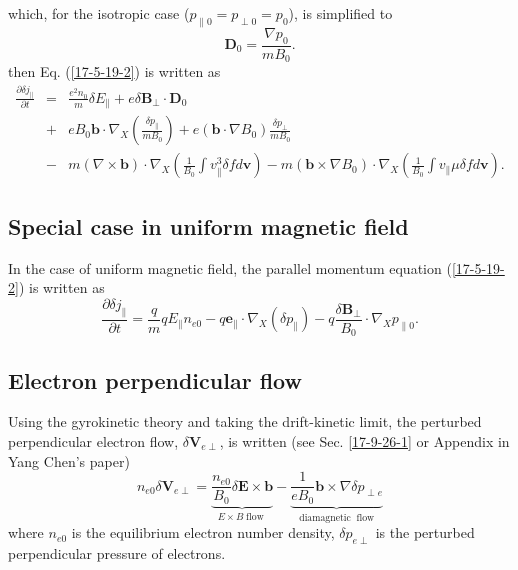 \documentclass{llncs}
\newcommand{\tmop}[1]{\ensuremath{\operatorname{#1}}}
\begin{document}
which, for the isotropic case ($p_{\parallel 0} = p_{\perp 0} = p_0$), is
simplified to
\begin{equation}
  \mathbf{D}_0 = \frac{\nabla p_0}{m B_0} .
\end{equation}
then Eq. (\ref{17-5-19-2}) is written as
\begin{eqnarray}
  \frac{\partial \delta j_{\parallel}}{\partial t} & = & \frac{e^2 n_0}{m}
  \delta E_{\parallel} + e \delta \mathbf{B}_{\perp} \cdot \mathbf{D}_0
  \nonumber\\
  & + & e B_0 \mathbf{b} \cdot \nabla_X \left( \frac{\delta p_{\parallel}}{m
  B_0} \right) + e (\mathbf{b} \cdot \nabla B_0) \frac{\delta p_{\perp}}{m
  B_0} \nonumber\\
  & - & m (\nabla \times \mathbf{b}) \cdot \nabla_X \left( \frac{1}{B_0} \int
  v_{\parallel}^3 \delta f d\mathbf{v} \right) - m (\mathbf{b} \times \nabla
  B_0) \cdot \nabla_X \left( \frac{1}{B_0} \int v_{\parallel} \mu \delta f
  d\mathbf{v} \right) . 
\end{eqnarray}


\subsection{Special case in uniform magnetic field}

In the case of uniform magnetic field, the parallel momentum equation
(\ref{17-5-19-2}) is written as
\begin{equation}
  \label{17-5-15-p8} \frac{\partial \delta j_{\parallel}}{\partial t} =
  \frac{q}{m} q E_{\parallel} n_{e 0} - q\mathbf{e}_{\parallel} \cdot \nabla_X
  (\delta p_{\parallel}) - q \frac{\delta \mathbf{B}_{\perp}}{B_0} \cdot
  \nabla_X p_{\parallel 0} .
\end{equation}

\subsection{Electron perpendicular flow}

Using the gyrokinetic theory and taking the drift-kinetic limit, the perturbed
perpendicular electron flow, $\delta \mathbf{V}_{e \perp}$, is written (see
Sec. \ref{17-9-26-1} or Appendix in Yang Chen's paper{\cite{ychen2009}})
\begin{equation}
  \label{17-5-8-1} n_{e 0} \delta \mathbf{V}_{e \perp} =
  \underbrace{\frac{n_{e 0}}{B_0} \delta \mathbf{E} \times \mathbf{b}}_{E
  \times B \tmop{flow}} - \underbrace{\frac{1}{e B_0} \mathbf{b} \times \nabla
  \delta p_{\perp e}}_{\tmop{diamagnetic} \tmop{flow}}
\end{equation}
where $n_{e 0}$ is the equilibrium electron number density, $\delta p_{e
\perp}$ is the perturbed perpendicular pressure of electrons.
\end{document}
